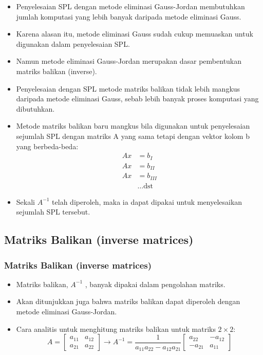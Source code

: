 \documentclass[pdflatex,compress,mathserif]{beamer}
\begin{document}
\begin{frame}
	\begin{itemize}
		\item Penyelesaian SPL dengan metode eliminasi Gauss-Jordan membutuhkan jumlah komputasi yang lebih banyak daripada metode eliminasi Gauss.
		\item Karena alasan itu, metode eliminasi Gauss sudah cukup memuaskan untuk digunakan dalam penyelesaian SPL.
		\item Namun metode eliminasi Gauss-Jordan merupakan dasar pembentukan matriks balikan (inverse).
	\end{itemize}
\end{frame}

\begin{frame}
	\begin{itemize}
		\item Penyelesaian dengan SPL metode matriks balikan tidak lebih mangkus daripada metode eliminasi Gauss, sebab lebih banyak proses komputasi yang dibutuhkan.
		\item Metode matriks balikan baru mangkus bila digunakan untuk penyelesaian sejumlah SPL dengan matriks A yang sama tetapi dengan vektor kolom b yang berbeda-beda:
		\begin{align*}
			Ax &= b_I \\
			Ax &= b_{II} \\
			Ax &= b_{III} \\
			&\dots \text{dst}
		\end{align*}
		\item Sekali $ A^{-1} $ telah diperoleh, maka ia dapat dipakai untuk
		menyelesaikan sejumlah SPL tersebut.
	\end{itemize}
\end{frame}

\subsection{Matriks Balikan (inverse matrices)}

\begin{frame}
	\frametitle{Matriks Balikan (inverse matrices)}
	\begin{itemize}
		\item Matriks balikan, $ A^{-1} $ , banyak dipakai dalam pengolahan
		matriks.
		\item Akan ditunjukkan juga bahwa matriks balikan dapat diperoleh dengan metode eliminasi Gauss-Jordan.
		\item Cara analitis untuk menghitung matriks balikan untuk matriks $2 \times 2$:
		\[
		A = 
		\begin{bmatrix}
			a_{11} & a_{12} \\ a_{21} & a_{22}
		\end{bmatrix}
		\rightarrow A^{-1} = \frac{1}{a_{11}a_{22} - a_{12}a_{21}}
		\begin{bmatrix}
			a_{22} & -a_{12} \\ -a_{21} & a_{11}
		\end{bmatrix}
		\]
	\end{itemize}
\end{frame}
\end{document}

